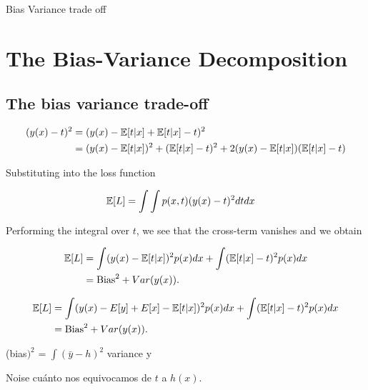 \begin{frame}{Bias Variance trade off}
\section{The Bias-Variance Decomposition}
\subsection{The bias variance trade-off}

\begin{align}
    (y(x)-t)^2 
    &=  
    (y(x) -\mathbb{E}[t|x] + \mathbb{E}[t|x] -t)^2  
    \\
    &= 
    (y(x) -\mathbb{E}[t|x])^2 
    + 
    (\mathbb{E}[t|x] -t)^2 
    +
    2(y(x) -\mathbb{E}[t|x])(\mathbb{E}[t|x] -t)
\end{align}

Substituting into the loss function 

\begin{align}
    \mathbb{E}[L] &= 
    \int \int
    p(x,t) (y(x)-t)^2 
    dt dx
\end{align}

Performing the integral over $t$, we see that the cross-term
vanishes and we obtain 

\begin{align}
    \mathbb{E}[L]
    &=  
    \int 
    (y(x) -\mathbb{E}[t|x])^2 p(x) dx
    + 
    \int 
    (\mathbb{E}[t|x] -t)^2 p(x) dx
    \\
    &=
    \text{Bias}^2 + Var(y(x)).
\end{align}
\end{frame}

\begin{frame}
    \begin{align}
        \mathbb{E}[L]
        &=  
        \int 
        (y(x)- E[y] + E[x] -\mathbb{E}[t|x])^2 p(x) dx
        + 
        \int 
        (\mathbb{E}[t|x] -t)^2 p(x) dx
        \\
        &=
        \text{Bias}^2 + Var(y(x)).
    \end{align}


    (bias$)^2$ = $\int (\bar y - h)^2$
    variance y

    Noise cuánto nos equivocamos de $t$ a $h(x)$. 
\end{frame}



